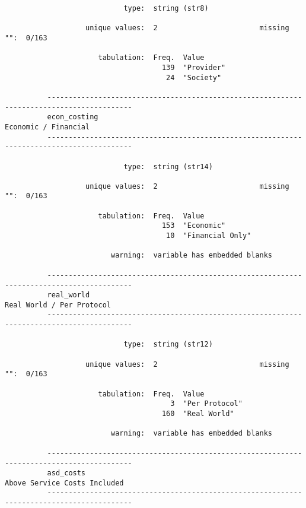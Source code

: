 \documentclass{article}
\begin{document}
\begin{verbatim}
                            type:  string (str8)
          
                   unique values:  2                        missing "":  0/163
          
                      tabulation:  Freq.  Value
                                     139  "Provider"
                                      24  "Society"
          
          ------------------------------------------------------------------------------------------
          econ_costing                                                          Economic / Financial
          ------------------------------------------------------------------------------------------
          
                            type:  string (str14)
          
                   unique values:  2                        missing "":  0/163
          
                      tabulation:  Freq.  Value
                                     153  "Economic"
                                      10  "Financial Only"
          
                         warning:  variable has embedded blanks
          
          ------------------------------------------------------------------------------------------
          real_world                                                       Real World / Per Protocol
          ------------------------------------------------------------------------------------------
          
                            type:  string (str12)
          
                   unique values:  2                        missing "":  0/163
          
                      tabulation:  Freq.  Value
                                       3  "Per Protocol"
                                     160  "Real World"
          
                         warning:  variable has embedded blanks
          
          ------------------------------------------------------------------------------------------
          asd_costs                                                     Above Service Costs Included
          ------------------------------------------------------------------------------------------
          

\end{verbatim}
\end{document}

